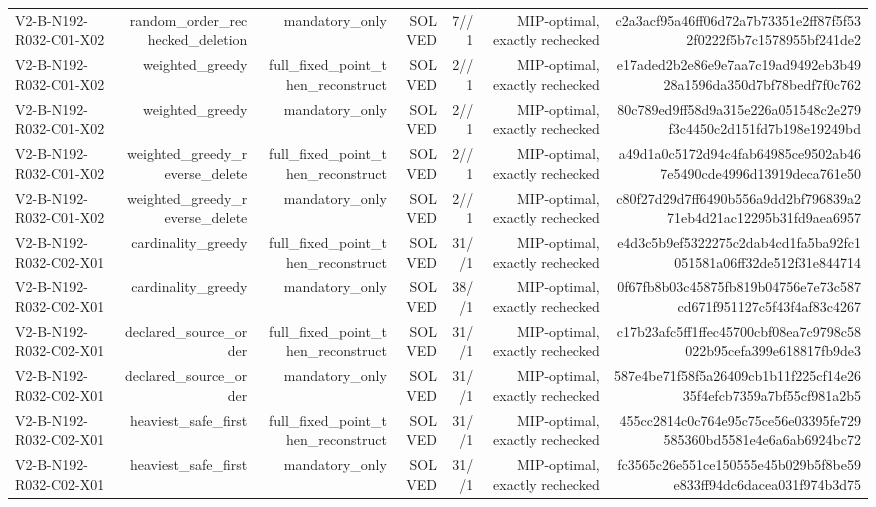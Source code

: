 {\begin{longtable}{lrrrrrr}
V2-B-N192-R032-C01-X02 & random\_order\_rechecked\_deletion & mandatory\_only & SOLVED & 7//1 & MIP-optimal, exactly rechecked & c2a3acf95a46ff06d72a7b73351e2ff87f5f532f0222f5b7c1578955bf241de2 \\
V2-B-N192-R032-C01-X02 & weighted\_greedy & full\_fixed\_point\_then\_reconstruct & SOLVED & 2//1 & MIP-optimal, exactly rechecked & e17aded2b2e86e9e7aa7c19ad9492eb3b4928a1596da350d7bf78bedf7f0c762 \\
V2-B-N192-R032-C01-X02 & weighted\_greedy & mandatory\_only & SOLVED & 2//1 & MIP-optimal, exactly rechecked & 80c789ed9ff58d9a315e226a051548c2e279f3c4450c2d151fd7b198e19249bd \\
V2-B-N192-R032-C01-X02 & weighted\_greedy\_reverse\_delete & full\_fixed\_point\_then\_reconstruct & SOLVED & 2//1 & MIP-optimal, exactly rechecked & a49d1a0c5172d94c4fab64985ce9502ab467e5490cde4996d13919deca761e50 \\
V2-B-N192-R032-C01-X02 & weighted\_greedy\_reverse\_delete & mandatory\_only & SOLVED & 2//1 & MIP-optimal, exactly rechecked & c80f27d29d7ff6490b556a9dd2bf796839a271eb4d21ac12295b31fd9aea6957 \\
V2-B-N192-R032-C02-X01 & cardinality\_greedy & full\_fixed\_point\_then\_reconstruct & SOLVED & 31//1 & MIP-optimal, exactly rechecked & e4d3c5b9ef5322275c2dab4cd1fa5ba92fc1051581a06ff32de512f31e844714 \\
V2-B-N192-R032-C02-X01 & cardinality\_greedy & mandatory\_only & SOLVED & 38//1 & MIP-optimal, exactly rechecked & 0f67fb8b03c45875fb819b04756e7e73c587cd671f951127c5f43f4af83c4267 \\
V2-B-N192-R032-C02-X01 & declared\_source\_order & full\_fixed\_point\_then\_reconstruct & SOLVED & 31//1 & MIP-optimal, exactly rechecked & c17b23afc5ff1ffec45700cbf08ea7c9798c58022b95cefa399e618817fb9de3 \\
V2-B-N192-R032-C02-X01 & declared\_source\_order & mandatory\_only & SOLVED & 31//1 & MIP-optimal, exactly rechecked & 587e4be71f58f5a26409cb1b11f225cf14e2635f4efcb7359a7bf55cf981a2b5 \\
V2-B-N192-R032-C02-X01 & heaviest\_safe\_first & full\_fixed\_point\_then\_reconstruct & SOLVED & 31//1 & MIP-optimal, exactly rechecked & 455cc2814c0c764e95c75ce56e03395fe729585360bd5581e4e6a6ab6924bc72 \\
V2-B-N192-R032-C02-X01 & heaviest\_safe\_first & mandatory\_only & SOLVED & 31//1 & MIP-optimal, exactly rechecked & fc3565c26e551ce150555e45b029b5f8be59e833ff94dc6dacea031f974b3d75 \\

\end{longtable}}
